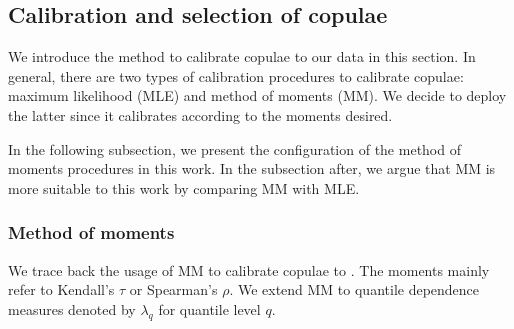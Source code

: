 
\subsection{Calibration and selection of copulae}\label{sec:estimation}
We introduce the method to calibrate copulae to our data in this section.
In general, there are two types of calibration procedures to calibrate copulae:
maximum likelihood (MLE) and method of moments (MM).
We decide to deploy the latter since it calibrates according to the moments desired. 

In the following subsection, we present the configuration of the method of moments procedures in this work.
In the subsection after, we argue that MM is more suitable to this work by comparing MM with MLE.

\subsubsection{Method of moments}
\label{subsec:simulated-method-of-moments}

We trace back the usage of MM to calibrate copulae to \citet{Genest1987, genest1993statistical}.
The moments mainly refer to Kendall's $\tau$ or Spearman's $\rho$.
We extend MM to quantile dependence measures denoted by $\lambda_q$ for quantile level $q$.

